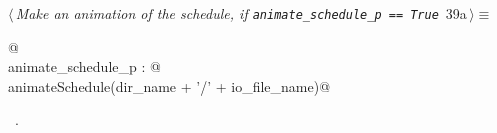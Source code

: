 \documentclass[11.5pt]{report}
\begin{document}
\begin{flushleft} \small
\begin{minipage}{\linewidth}\label{scrap41}\raggedright\small
{} $\langle\,${\itshape Make an animation of the schedule, if \verb|animate_schedule_p == True|}\nobreak\ {\footnotesize {39a}}$\,\rangle\equiv$
\vspace{-1ex}
\begin{list}{}{} \item
\mbox{}\verb@   @\\
\mbox{}\verb@if animate_schedule_p : @\\
\mbox{}\verb@     animateSchedule(dir_name + '/' + io_file_name)@\\
\mbox{}\verb@@{\NWsep}
\end{list}
\vspace{-1.5ex}
\footnotesize
\begin{list}{}{\setlength{\itemsep}{-\parsep}\setlength{\itemindent}{-\leftmargin}}
\item \NWtxtMacroRefIn\ .

\item{}
\end{list}
\end{minipage}\vspace{4ex}
\end{flushleft}
\vspace{-0.8cm}\newchunk 
\end{document}

